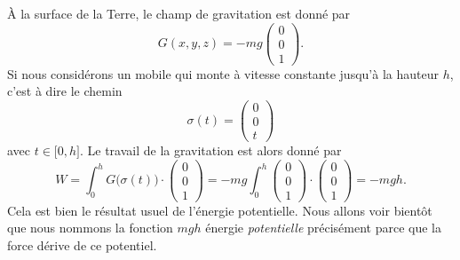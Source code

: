 \begin{example}
    À la surface de la Terre, le champ de gravitation est donné par
    \begin{equation}
        G(x,y,z)=-mg\begin{pmatrix}
            0    \\ 
            0    \\ 
            1    
        \end{pmatrix}.
    \end{equation}
    Si nous considérons un mobile qui monte à vitesse constante jusqu'à la hauteur $h$, c'est à dire le chemin
    \begin{equation}
        \sigma(t)=\begin{pmatrix}
            0    \\ 
            0    \\ 
            t    
        \end{pmatrix}
    \end{equation}
    avec $t\in\mathopen[ 0 , h \mathclose]$. Le travail de la gravitation est alors donné par
    \begin{equation}
        W=\int_0^hG\big( \sigma(t) \big)\cdot\begin{pmatrix}
            0    \\ 
            0    \\ 
            1    
        \end{pmatrix}=
        -mg\int_0^h\begin{pmatrix}
            0    \\ 
            0    \\ 
            1    
        \end{pmatrix}\cdot\begin{pmatrix}
            0    \\ 
            0    \\ 
            1    
        \end{pmatrix}=-mgh.
    \end{equation}
    Cela est bien le résultat usuel de l'énergie potentielle. Nous allons voir bientôt que nous nommons la fonction $mgh$ énergie \emph{potentielle} précisément parce que la force dérive de ce potentiel.
\end{example}

